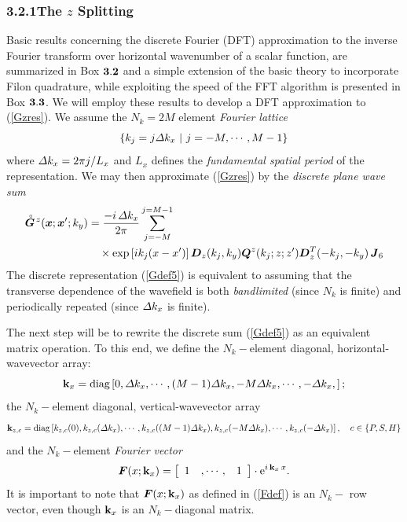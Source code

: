\documentclass[11pt,a4paper]{article}
\newcommand{\bmi}[1]{\mbox{\boldmath$\mit #1$\unboldmath}}
\newcommand{\rf}[1]{\stackrel{\scriptscriptstyle _{\,\,\circ}}{ #1}}
\begin{document}
\subsubsection*{3.2.1\quad The $z$ Splitting}

Basic results concerning the discrete Fourier (DFT) approximation to the inverse
Fourier transform over horizontal wavenumber of a scalar function,
 are summarized in {\sc Box} $\bf 3.2$ and a simple extension of the
 basic theory to incorporate Filon quadrature, while exploiting the speed
 of the FFT algorithm is presented in {\sc Box} $\bf 3.3$.
We will employ these results to develop a DFT approximation to (\ref{Gzres}).
We assume the $N_k=2 M$ element {\em Fourier lattice\/}
\begin{equation} \label{pspec}
\left\{
 {k}_{j} =j {\mit \Delta} k_{x} \ |\  j=-M,\cdots ,M-1
\right\}
\end{equation}
where ${\mit \Delta} k_{x} =2 \pi  j/L_{x}$ and   $L_{x}$ defines the {\em fundamental spatial period\/}
of the representation.
We may then approximate (\ref{Gzres}) by the {\em discrete
plane wave sum\/}
\begin{align} \label{Gdef5}
\rf{\bmi G}\!{}^{z}({\bmi x};{\bmi x}^{\prime};k_y)&=\frac{- i\,{\mit \Delta} {k}_{x}}{2 \pi}
\sum\limits_{{j=-M}}^{j=M-1}
\nonumber\\
&\quad\times
\exp \left[i {k}_{j} ({ x}-{
x}^{\prime})\right] {\bmi  D}_{z}({k}_{j},{k}_{y})
{\bmi Q}^{z}({k}_{j};z;z^{\prime}){\bmi  D}_{z}^{T}(-{k}_{j},-{k}_{y})
\,{\bmi  J}_6
\end{align}
The discrete representation (\ref{Gdef5}) is equivalent to assuming that the
transverse dependence of the wavefield is both {\em  bandlimited\/}
(since $N_k$ is
finite) and periodically repeated (since ${\mit \Delta} {k}_{x}$ is finite).


The next step will be to rewrite the discrete sum (\ref{Gdef5}) as an
equivalent matrix operation. To this end, we define the $N_k-$element
diagonal,
horizontal-wavevector array:
\begin{equation} \label{gKx}
{\bf  k}_{x} =\mbox{diag}\left[0,
{\mit \Delta} k_{x},\cdots, (M -1){\mit \Delta} k_{x},
-M {\mit \Delta} k_{x},\cdots,-{\mit \Delta} k_{x},\right];
\end{equation}
the $N_k-$element
diagonal,
vertical-wavevector array
\begin{equation} \label{gKz}
{\bf  k}_{z,c} =\mbox{diag}\left[{ k}_{z,c}(0),{ k}_{z,c}({\mit \Delta} k_{x}),\cdots,
{ k}_{z,c}((M-1){\mit \Delta} k_{x}),
{ k}_{z,c}(-M{\mit \Delta} k_{x}),
\cdots, { k}_{z,c}(-{\mit \Delta} k_{x})\right], \quad c\in\{P,S,H\}
\end{equation}
and the $N_k-$element {\em Fourier vector\/}
\begin{equation} \label{Fdef}
{\bmi F}(x;{\bf k}_{x})=
\left[\begin{array}{ccc} 1&, \cdots, &1 \end{array}
\right]\cdot{\rm e}^{i\,
{\bf k}_{x}\,x}.
\end{equation}
It is important to note that ${\bmi F}(x;{\bf k}_{x})$ as defined in
(\ref{Fdef}) is an $N_k-$ row vector, even though ${\bf k}_{x}$ is an
$N_k-$diagonal matrix.
\end{document}
